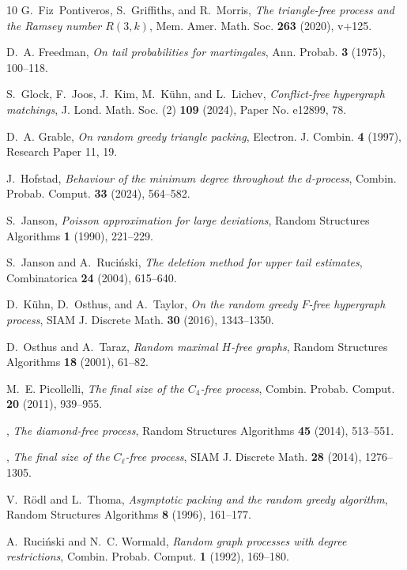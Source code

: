 \documentclass[11pt]{amsart}
\theoremstyle{definition}
\numberwithin{equation}{section}
\begin{document}
\begin{thebibliography}{10}
G.~Fiz~Pontiveros, S.~Griffiths, and R.~Morris, \emph{The triangle-free process and the {R}amsey number {$R(3,k)$}}, Mem. Amer. Math. Soc. \textbf{263} (2020), v+125.

D.~A. Freedman, \emph{On tail probabilities for martingales}, Ann. Probab. \textbf{3} (1975), 100--118.

S.~Glock, F.~Joos, J.~Kim, M.~K\"{u}hn, and L.~Lichev, \emph{Conflict-free hypergraph matchings}, J. Lond. Math. Soc. (2) \textbf{109} (2024), Paper No. e12899, 78.

D.~A. Grable, \emph{On random greedy triangle packing}, Electron. J. Combin. \textbf{4} (1997), Research Paper 11, 19.

J.~Hofstad, \emph{Behaviour of the minimum degree throughout the {$d$}-process}, Combin. Probab. Comput. \textbf{33} (2024), 564--582.

S.~Janson, \emph{Poisson approximation for large deviations}, Random Structures Algorithms \textbf{1} (1990), 221--229.

S.~Janson and A.~Ruci\'{n}ski, \emph{The deletion method for upper tail estimates}, Combinatorica \textbf{24} (2004), 615--640.

D.~K\"uhn, D.~Osthus, and A.~Taylor, \emph{On the random greedy {$F$}-free hypergraph process}, SIAM J. Discrete Math. \textbf{30} (2016), 1343--1350.

D.~Osthus and A.~Taraz, \emph{Random maximal {$H$}-free graphs}, Random Structures Algorithms \textbf{18} (2001), 61--82.

M.~E. Picollelli, \emph{The final size of the {$C_4$}-free process}, Combin. Probab. Comput. \textbf{20} (2011), 939--955.

\bysame, \emph{The diamond-free process}, Random Structures Algorithms \textbf{45} (2014), 513--551.

\bysame, \emph{The final size of the {$C_\ell$}-free process}, SIAM J. Discrete Math. \textbf{28} (2014), 1276--1305.

V.~R\"{o}dl and L.~Thoma, \emph{Asymptotic packing and the random greedy algorithm}, Random Structures Algorithms \textbf{8} (1996), 161--177.

A.~Ruci\'{n}ski and N.~C. Wormald, \emph{Random graph processes with degree restrictions}, Combin. Probab. Comput. \textbf{1} (1992), 169--180.


\end{thebibliography}
\end{document}

